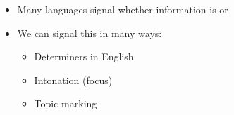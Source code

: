 \documentclass[headrule,footrule]{foils}
\begin{document}




\begin{itemize}
\item Many languages signal whether information is  or 

\item We can signal this in many ways:
  \begin{itemize}
  \item Determiners in English
  \item Intonation (focus)
  \item Topic marking
  \end{itemize}
\end{itemize}
\end{document}
